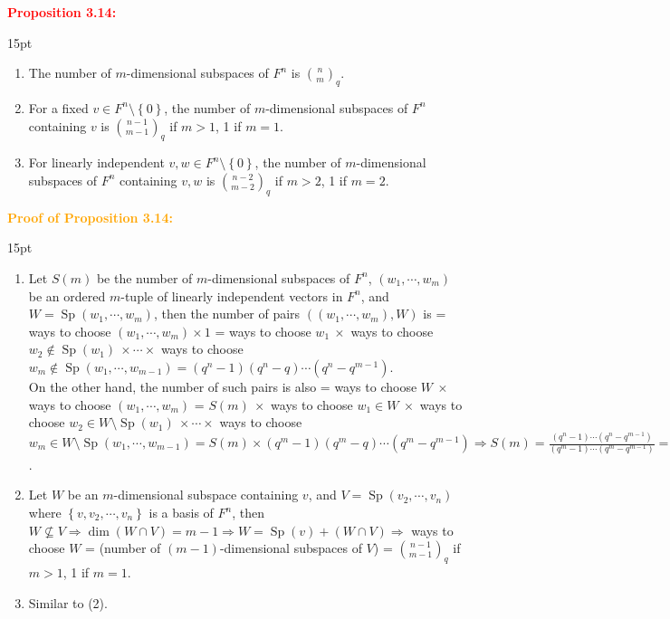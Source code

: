 \documentclass[12pt]{article}
\newcommand{\noparskip}{\vspace{-\parskip}}
\newenvironment{points}
	{\begin{enumerate}[label = (\arabic*)]}
	{\end{enumerate}}
\newenvironment{dent}
	{\begin{adjustwidth}{15pt}{}\noparskip}
	{\end{adjustwidth}}
\newenvironment{result}[1]
	{\textcolor{Red}{\textbf{#1:}}\begin{dent}}
	{\end{dent}}
\newenvironment{proof}[1]
	{\textcolor{Orange}{\textbf{Proof of #1:}}\begin{dent}}
	{\end{dent}}
\renewcommand{\implies}{\Rightarrow}
\newcommand{\set}[1]{\left\{ #1 \right\}}
\renewcommand{\span}[1]{\operatorname{Sp}(#1)}
\begin{document}
\begin{result}{Proposition 3.14}
\begin{points}
\item The number of $m$-dimensional subspaces of $F^n$ is $\binom{n}{m}_q$.
\item For a fixed $v \in F^n \setminus \set{0}$, the number of $m$-dimensional subspaces of $F^n$ containing $v$ is $\binom{n - 1}{m - 1}_q$ if $m > 1$, 1 if $m = 1$.
\item For linearly independent $v, w \in F^n \setminus \set{0}$, the number of $m$-dimensional subspaces of $F^n$ containing $v, w$ is $\binom{n - 2}{m - 2}_q$ if $m > 2$, 1 if $m = 2$.
\end{points}
\end{result}

\begin{proof}{Proposition 3.14}
\begin{points}
\item Let $S(m)$ be the number of $m$-dimensional subspaces of $F^n$, $(w_1, \cdots, w_m)$ be an ordered $m$-tuple of linearly independent vectors in $F^n$, and $W = \span{w_1, \cdots, w_m}$, then the number of pairs $((w_1, \cdots, w_m), W)$ is = ways to choose $(w_1, \cdots, w_m) \times 1$ = ways to choose $w_1\ \times$ ways to choose $w_2 \notin \span{w_1}\ \times \cdots \times$ ways to choose $w_m \notin \span{w_1, \cdots, w_{m - 1}} = (q^n - 1)(q^n - q) \cdots (q^n - q^{m - 1})$. \\
On the other hand, the number of such pairs is also = ways to choose $W\ \times$ ways to choose $(w_1, \cdots, w_m)$ = $S(m)\ \times$ ways to choose $w_1 \in W\ \times$ ways to choose $w_2 \in W \setminus \span{w_1}\ \times \cdots \times$ ways to choose $w_m \in W \setminus \span{w_1, \cdots, w_{m - 1}} = S(m) \times (q^m - 1)(q^m - q) \cdots (q^m - q^{m - 1}) \implies S(m) = \frac{(q^n - 1) \cdots (q^n - q^{m - 1})}{(q^m - 1) \cdots (q^m - q^{m - 1})} = \frac{(q^n - 1) \cdots (q^{n - m + 1} - 1)}{(q^m - 1) \cdots (q - 1)} = \binom{n}{m}_q$.
\item Let $W$ be an $m$-dimensional subspace containing $v$, and $V = \span{v_2, \cdots, v_n}$ where $\set{v, v_2, \cdots, v_n}$ is a basis of $F^n$, then $W \nsubseteq V \implies \dim (W \cap V) = m - 1 \implies W = \span{v} + (W \cap V) \implies$ ways to choose $W$ = (number of $(m - 1)$-dimensional subspaces of $V$) = $\binom{n - 1}{m - 1}_q$ if $m > 1$, 1 if $m = 1$.
\item Similar to (2).
\end{points}
\end{proof}
\end{document}
